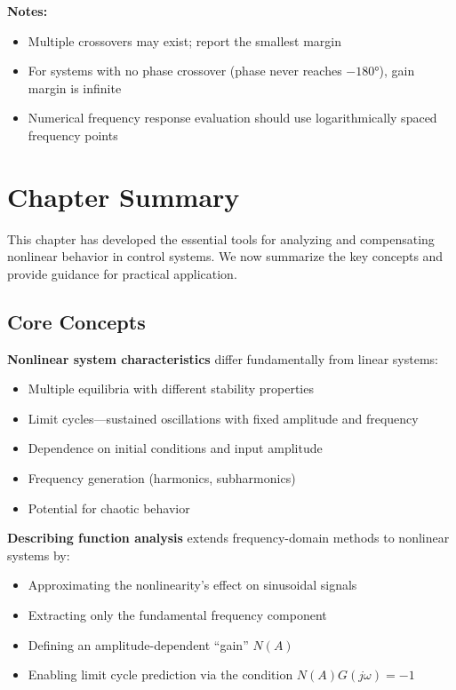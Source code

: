 \textbf{Notes:}
\begin{itemize}
    \item Multiple crossovers may exist; report the smallest margin
    \item For systems with no phase crossover (phase never reaches $-180°$), gain margin is infinite
    \item Numerical frequency response evaluation should use logarithmically spaced frequency points
\end{itemize}

\section{Chapter Summary}
\label{sec:summary}

This chapter has developed the essential tools for analyzing and compensating nonlinear behavior in control systems. We now summarize the key concepts and provide guidance for practical application.

\subsection{Core Concepts}

\textbf{Nonlinear system characteristics} differ fundamentally from linear systems:
\begin{itemize}
    \item Multiple equilibria with different stability properties
    \item Limit cycles---sustained oscillations with fixed amplitude and frequency
    \item Dependence on initial conditions and input amplitude
    \item Frequency generation (harmonics, subharmonics)
    \item Potential for chaotic behavior
\end{itemize}

\textbf{Describing function analysis} extends frequency-domain methods to nonlinear systems by:
\begin{itemize}
    \item Approximating the nonlinearity's effect on sinusoidal signals
    \item Extracting only the fundamental frequency component
    \item Defining an amplitude-dependent ``gain'' $N(A)$
    \item Enabling limit cycle prediction via the condition $N(A)G(j\omega) = -1$
\end{itemize}

